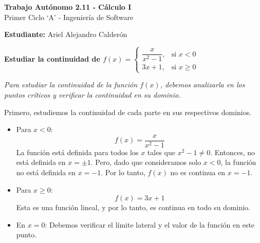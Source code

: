 \documentclass[answers]{exam} %
\begin{document}
\begin{center}
    \large\textbf{Trabajo Autónomo 2.11 - Cálculo I}\\[1em]
    \large Primer Ciclo \enquote*{A} - Ingeniería de Software\\[1em]
\end{center}

\vspace{0.5cm}
\large\textbf{Estudiante:} Ariel Alejandro Calderón
\vspace{0.5cm}

\begin{questions}

    \question \large\textbf{Estudiar la continuidad de \(f(x) =
    \begin{cases}
        \dfrac{x}{x^2 -1}, & \text{si } x < 0 \\
        3x + 1, & \text{si } x \ge 0
    \end{cases}\)}
    \begin{solution}

        \vspace{0.2cm}

        \emph{Para estudiar la continuidad de la función \( f(x) \), debemos analizarla en los puntos críticos y verificar la continuidad en su dominio.}

        \vspace{0.2cm}


        Primero, estudiemos la continuidad de cada parte en sus respectivos dominios.

        \begin{itemize}
            \item Para \( x < 0 \):
                \[
                f(x) = \frac{x}{x^2 - 1}
                \]
                La función está definida para todos los \( x \) tales que \( x^2 - 1 \neq 0 \). Entonces, no está definida en \( x = \pm 1 \). Pero, dado que consideramos solo \( x < 0 \), la función no está definida en \( x = -1 \). Por lo tanto, \( f(x) \) no es continua en \( x = -1 \).

            \item Para \( x \ge 0 \):
                \[
                f(x) = 3x + 1
                \]
                Esta es una función lineal, y por lo tanto, es continua en todo su dominio.

            \item En \( x = 0 \):
                Debemos verificar el límite lateral y el valor de la función en este punto.


\end{itemize}
\end{solution}
\end{questions}
\end{document}

